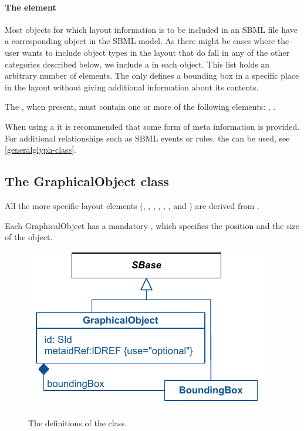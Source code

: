 \paragraph{The  element}
\label{listofadditionalgraphicalobjects-class}
Most objects for which layout information is to be included in an SBML 
file have a corresponding object in the SBML model. As there might be 
cases where the user wants to include object types in the layout that do 
fall in any of the other categories described below, we include a 
 in each \Layout object. This 
list holds an arbitrary number of  elements. The 
 only defines a bounding box in a specific place 
in the layout without giving additional information about its contents. 

The , when present, must contain 
one or more of the following elements: \GraphicalObject, \GeneralGlyph. 

When using a \GraphicalObject it is recommended that some form of meta 
information is provided. For additional relationships such as SBML events 
or rules, the \GeneralGlyph can be used, see \ref{generalglyph-class}. 

\subsection{The GraphicalObject class} 
\label{graphicalobject-class}
All the more specific layout elements (\CompartmentGlyph, \GeneralGlyph, 
\SpeciesGlyph, \ReactionGlyph, \ReferenceGlyph, \TextGlyph, and 
\SpeciesReferenceGlyph) are derived from \GraphicalObject. 

Each GraphicalObject has a mandatory \BoundingBox, which specifies the position 
and the size of the object. 

\begin{figure}[!ht]
\includegraphics{uml/layout-graphicalobject-uml}\\
\label{uml:graphicalobject}
\caption{The definitions of the \GraphicalObject class.}
\end{figure}


